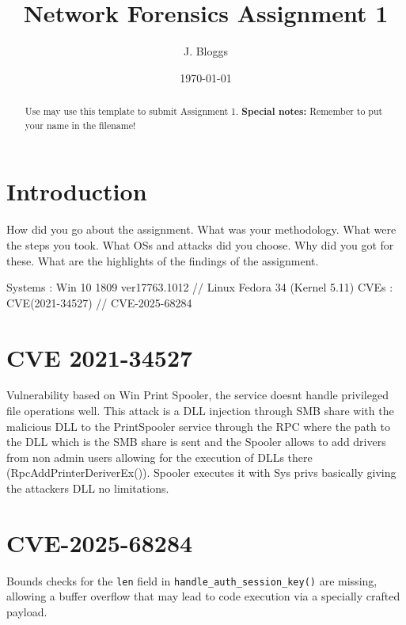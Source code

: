 \documentclass[letterpaper,12pt]{article}
\begin{document}
\title{\color{blue}Network Forensics Assignment 1}
\author{\color{blue}J. Bloggs}
\date{\color{blue}\today}
\maketitle



\begin{abstract}
Use may use this template to submit Assignment 1. \textbf{Special notes:} Remember to put your name in the filename!
\end{abstract}



\section{Introduction}

How did you go about the assignment. What was your methodology. What were the steps you took. What OSs and attacks did you choose. Why did you got for these. What are the highlights of the findings of the assignment.

Systems	: Win 10 1809 ver17763.1012 // Linux Fedora 34 (Kernel 5.11)
CVEs	: CVE(2021-34527)			// CVE-2025-68284

\section{CVE 2021-34527}

Vulnerability based on Win Print Spooler, the service doesnt handle privileged file operations well. This attack is a DLL injection through SMB share with the malicious DLL to the PrintSpooler service through the RPC where the path to the DLL which is the SMB share is sent and the Spooler allows to add drivers from non admin users allowing for the execution of DLLs there (RpcAddPrinterDeriverEx()). Spooler executes it with Sys privs basically giving the attackers DLL no limitations.

\section{CVE-2025-68284}

Bounds checks for the \texttt{len} field in \texttt{handle\_auth\_session\_key()} are
missing, allowing a buffer overflow that may lead to code execution via a
specially crafted payload.
\end{document}
